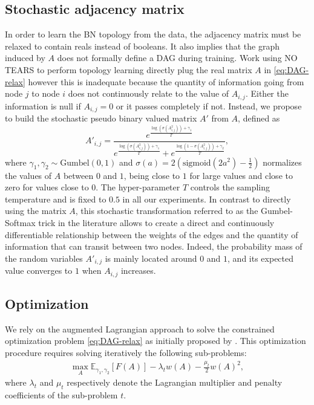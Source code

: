 \subsection{Stochastic adjacency matrix}
In order to learn the BN topology from the data, the adjacency matrix must be relaxed to contain reals instead of booleans. It also implies that the graph induced by $A$ does not formally define a DAG during training. Work using NO TEARS to perform topology learning directly plug the real matrix $A$ in \eqref{eq:DAG-relax} \citep{DAG-1, DAG-2, DAG-3, DAG-4} however this is inadequate because the quantity of information going from node $j$ to node $i$ does not continuously relate to the value of $A_{i,j}$. Either the information is null if $A_{i,j} = 0$ or it passes completely if not. Instead, %
we propose to build the stochastic pseudo binary valued matrix $A'$ from $A$, defined as
$$A'_{i, j} = \frac{e^{\frac{\log(\sigma(A_{i,j}^2)) + \gamma_1}{T}}}{e^{\frac{\log(\sigma(A_{i,j}^2)) + \gamma_1}{T}} + e^{\frac{\log(1 - \sigma(A_{i,j}^2)) + \gamma_2}{T}}}, $$
where $\gamma_1, \gamma_2 \sim \text{Gumbel}(0, 1)$ and $\sigma(a) = 2(\text{sigmoid}(2a^2) - \frac{1}{2})$ normalizes the values of $A$ between $0$ and $1$, being close to $1$ for large values and close to zero for values close to $0$. The hyper-parameter $T$ controls the sampling temperature and is fixed to $0.5$ in all our experiments.
In contrast to directly using the matrix $A$, this stochastic transformation referred to as the Gumbel-Softmax trick in the literature \citep{gumbel1, gumbel2} allows to create a direct and continuously differentiable relationship between the weights of the edges and the quantity of information that can transit between two nodes. Indeed, the probability mass of the random variables $A'_{i,j}$ is mainly located around $0$ and $1$, and its expected value converges to $1$ when $A_{i,j}$ increases.

\subsection{Optimization} \label{sec:optim}
We rely on the augmented Lagrangian approach to solve the constrained optimization problem \eqref{eq:DAG-relax} as initially proposed by \citet{DAG-1}. This optimization procedure requires solving iteratively the following sub-problems:
\begin{align}
    \max_{A} \mathbb{E}_{\gamma_1, \gamma_2}\left[F(A)\right] - \lambda_t w(A) - \frac{\mu_t}{2} w(A)^2, \label{eq:loss}
\end{align}
where $\lambda_t$ and $\mu_t$ respectively denote the Lagrangian multiplier and penalty coefficients of the sub-problem $t$.


